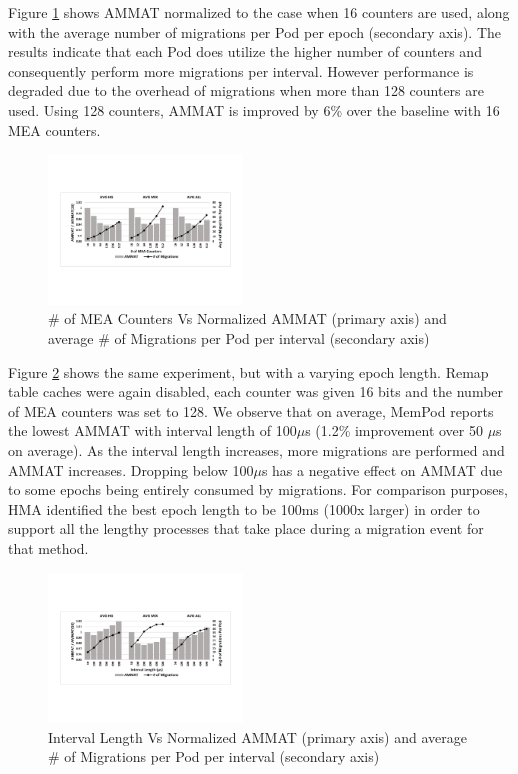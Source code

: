 Figure \ref{fig:num_counters} shows AMMAT normalized to the case when 16 counters are used, along with the average number of migrations per Pod per epoch (secondary axis). The results indicate that each Pod does utilize the higher number of counters and consequently perform more migrations per interval. However performance is degraded due to the overhead of migrations when more than 128 counters are used. Using 128 counters, AMMAT is improved by 6\% over the baseline with 16 MEA counters. 

\begin{figure}[h]
	\centering
  \includegraphics[width=0.46\textwidth]{figures/revised/old/num_mea.pdf}
  \caption{\# of MEA Counters Vs Normalized AMMAT (primary axis) and average \# of Migrations per Pod per interval (secondary axis)}
  \label{fig:num_counters}
\end{figure}

Figure \ref{fig:interval} shows the same experiment, but with a varying epoch length. Remap table caches were again disabled, each counter was given 16 bits and the number of MEA counters was set to 128. We observe that on average, MemPod reports the lowest AMMAT with interval length of 100$\mu$s (1.2\% improvement over 50 $\mu$s on average). As the interval length increases, more migrations are performed and AMMAT increases. Dropping below 100$\mu$s has a negative effect on AMMAT due to some epochs being entirely consumed by migrations. For comparison purposes, HMA \cite{meswani-HPCA21} identified the best epoch length to be 100ms (1000x larger) in order to support all the lengthy processes that take place during a migration event for that method.

\begin{figure}[h]
  \includegraphics[width=0.46\textwidth]{figures/revised/old/interval.pdf}
  \caption{Interval Length Vs Normalized AMMAT (primary axis) and average \# of Migrations per Pod per interval (secondary axis)}
  \label{fig:interval}
\end{figure}

